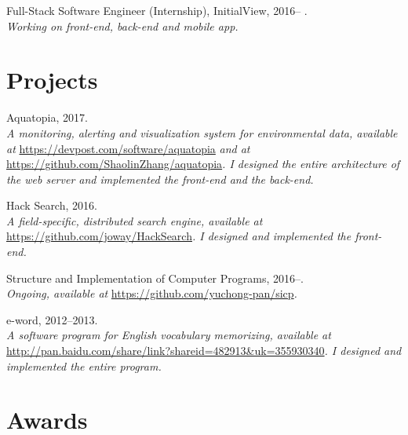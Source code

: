 \documentclass[letterpaper]{article}
\renewenvironment{itemize}{
  \begin{list}{}{
    \setlength{\leftmargin}{1.5em}
  }
}{
  \end{list}
}
\begin{document}
\begin{itemize}
  \item Full-Stack Software Engineer (Internship), InitialView, 2016-- .\\
  \emph{Working on front-end, back-end and mobile app.}
\end{itemize}


\section*{Projects}

\begin{itemize}
  \item Aquatopia, 2017.\\
  \emph{A monitoring, alerting and visualization system for environmental data, available at }\url{https://devpost.com/software/aquatopia}\emph{ and at }\url{https://github.com/ShaolinZhang/aquatopia}\emph{. I designed the entire architecture of the web server and implemented the front-end and the back-end.}

  \item Hack Search, 2016.\\
  \emph{A field-specific, distributed search engine, available at }\url{https://github.com/joway/HackSearch}\emph{. I designed and implemented the front-end.}

  \item Structure and Implementation of Computer Programs, 2016--.\\
  \emph{Ongoing, available at }\url{https://github.com/yuchong-pan/sicp}\emph{.}

  \item e-word, 2012--2013.\\
  \emph{A software program for English vocabulary memorizing, available at }\url{http://pan.baidu.com/share/link?shareid=482913&uk=355930340}\emph{. I designed and implemented the entire program.}

\end{itemize}


\section*{Awards}
\end{document}
